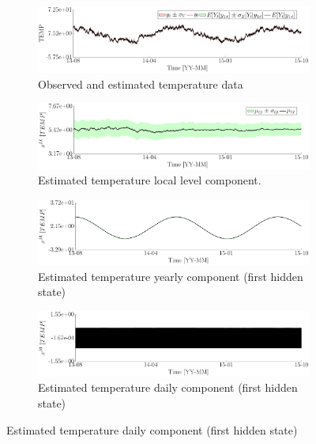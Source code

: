 \begin{figure}[h!]
\ContinuedFloat
\begin{subfigure}{\linewidth}\centering
\includegraphics[width=0.9\linewidth]{./docfigs/Example_DISPTEMPSIM/optim_param_optim_initialhiddenstate/TEMP_ObservedPredicted.pdf} 
\caption{Observed and estimated temperature data}
\end{subfigure}
\begin{subfigure}{\linewidth}\centering
\includegraphics[width=0.9\linewidth]{./docfigs/Example_DISPTEMPSIM/optim_param_optim_initialhiddenstate/TEMP_LL_1.pdf} 
\caption{Estimated temperature local level component.}
\end{subfigure}
\begin{subfigure}{\linewidth}\centering
\includegraphics[width=0.9\linewidth]{./docfigs/Example_DISPTEMPSIM/optim_param_optim_initialhiddenstate/TEMP_S1_2.pdf} 
\caption{Estimated temperature yearly component (first hidden state)}
\end{subfigure}
\begin{subfigure}{\linewidth}\centering
\includegraphics[width=0.9\linewidth]{./docfigs/Example_DISPTEMPSIM/optim_param_optim_initialhiddenstate/TEMP_S1_4.pdf} 
\caption{Estimated temperature daily component (first hidden state)}

\end{subfigure}
\end{figure}
